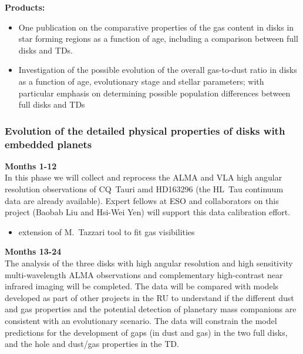 \documentclass[10pt,fleqn,twoside]{article}
\begin{document}
\smallskip
{\bf Products:} 
\begin{itemize}
\item One publication on the comparative properties of the gas content in disks in star forming regions as a function of age, including a comparison between full disks and TDs.
\item Investigation of the possible evolution of the overall gas-to-dust ratio in disks as a function of age, evolutionary stage and stellar parameters; with particular emphasis on determining possible population differences between full disks and TDs
\end{itemize}

\subsubsection{Evolution of the detailed physical properties of disks with embedded planets}


{\Tcol\bf Months 1-12}\\
In this phase we will collect and reprocess the ALMA and VLA high angular resolution observations of CQ~Tauri amd HD163296 (the HL~Tau continuum data are already available). Expert fellows at ESO and collaborators on this project (Baobab Liu and Hsi-Wei Yen) will support this data calibration effort. 
\begin{itemize}
\item extension of M.~Tazzari tool to fit gas visibilities 
\end{itemize}

{\Tcol\bf Months 13-24}\\
The analysis of the three disks with high angular resolution and high sensitivity multi-wavelength ALMA observations and complementary high-contrast near infrared imaging will be completed. The data will be compared with models developed as part of other projects in the RU to understand if the different dust 
and gas properties and the potential detection of planetary mass companions are consistent with an evolutionary scenario. The data will constrain the model predictions for the development of gaps (in dust and gas) in the two full disks, and the hole and dust/gas properties in the TD.
\end{document}

